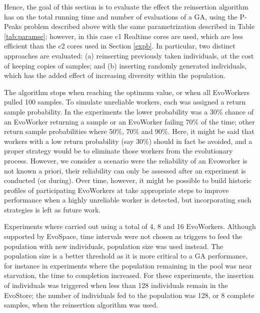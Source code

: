 Hence, the goal of this section is to evaluate the effect the reinsertion algorithm has on the total
running time and number of evaluations of a GA, using the P-Peaks problem described above with the same parametrization described in Table \ref{tab:paramse};
however, in this case c1 Realtime cores are used, which are less efficient than the c2 cores used in Section \ref{expb}.
In particular, two distinct approaches are evaluated: (a) reinserting previously taken individuals, at the cost of keeping copies of
samples; and (b) inserting randomly generated individuals, which has the added effect of increasing diversity within the population.

The algorithm stops when reaching the optimum value, or when all EvoWorkers
pulled 100 samples. To simulate unreliable workers, each was assigned a
return sample probability. In the experiments the lower probability was a 30\%
chance of an EvoWorker returning a sample or an EvoWorker failing 70\% of the
time; other return sample probabilities where 50\%, 70\% and 90\%.
Here, it might be said that workers with a low return probability (say 30\%) should in fact be avoided,
and a proper strategy would be to eliminate those workers from the evolutionary process.
However, we consider a scenario were the reliability of an Evoworker is not known a priori, their reliability can only be assessed after an experiment is conducted (or during).
Over time, however, it might be possible to build historic profiles of participating EvoWorkers at take appropriate steps to improve performance when a highly unreliable
worker is detected, but incorporating such strategies is left as future work.

Experiments where carried out using a total of 4, 8 and 16 EvoWorkers.
Although supported by EvoSpace, time intervals were not chosen as triggers
to feed the population with new individuals, population size was used instead.
The population size is a better threshold as it is more critical
to a GA performance, for instance in experiments where the population remaining in the pool was near starvation, the time to completion increased.
For these experiments, the insertion of individuals was triggered when less than
128 individuals remain in the EvoStore; the number of individuals fed to the
population was 128, or 8 complete samples, when the reinsertion algorithm was used.



